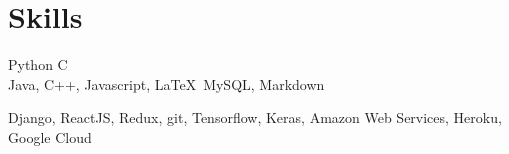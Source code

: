
\section{Skills}
Python \textbullet{}   C \\
Java, C++, Javascript, \LaTeX\, MySQL, Markdown
\sectionsep

Django, ReactJS, Redux, git, Tensorflow, Keras, Amazon Web Services, Heroku, Google Cloud
\sectionsep
